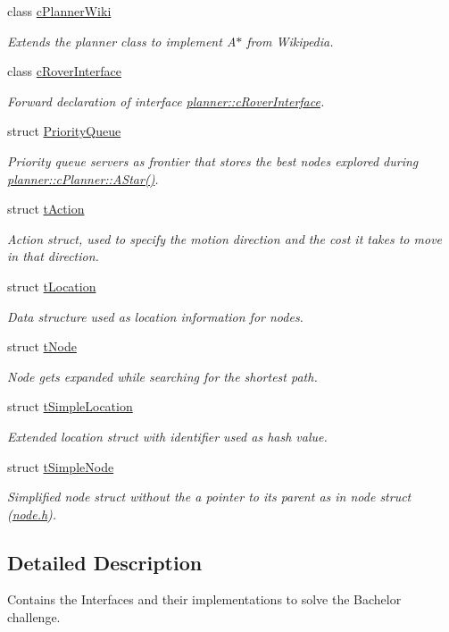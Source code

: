 \begin{DoxyCompactItemize}
class \mbox{\hyperlink{classplanner_1_1c_planner_wiki}{c\+Planner\+Wiki}}
\begin{DoxyCompactList}\small\item\em Extends the planner class to implement A$\ast$ from Wikipedia. \end{DoxyCompactList}\item 
class \mbox{\hyperlink{classplanner_1_1c_rover_interface}{c\+Rover\+Interface}}
\begin{DoxyCompactList}\small\item\em Forward declaration of interface \mbox{\hyperlink{classplanner_1_1c_rover_interface}{planner\+::c\+Rover\+Interface}}. \end{DoxyCompactList}\item 
struct \mbox{\hyperlink{structplanner_1_1_priority_queue}{Priority\+Queue}}
\begin{DoxyCompactList}\small\item\em Priority queue servers as frontier that stores the best nodes explored during \mbox{\hyperlink{classplanner_1_1c_planner_a341e70531266f023ac9461d18979d1ef}{planner\+::c\+Planner\+::\+A\+Star()}}. \end{DoxyCompactList}\item 
struct \mbox{\hyperlink{structplanner_1_1t_action}{t\+Action}}
\begin{DoxyCompactList}\small\item\em Action struct, used to specify the motion direction and the cost it takes to move in that direction. \end{DoxyCompactList}\item 
struct \mbox{\hyperlink{structplanner_1_1t_location}{t\+Location}}
\begin{DoxyCompactList}\small\item\em Data structure used as location information for nodes. \end{DoxyCompactList}\item 
struct \mbox{\hyperlink{structplanner_1_1t_node}{t\+Node}}
\begin{DoxyCompactList}\small\item\em Node gets expanded while searching for the shortest path. \end{DoxyCompactList}\item 
struct \mbox{\hyperlink{structplanner_1_1t_simple_location}{t\+Simple\+Location}}
\begin{DoxyCompactList}\small\item\em Extended location struct with identifier used as hash value. \end{DoxyCompactList}\item 
struct \mbox{\hyperlink{structplanner_1_1t_simple_node}{t\+Simple\+Node}}
\begin{DoxyCompactList}\small\item\em Simplified node struct without the a pointer to its parent as in node struct (\mbox{\hyperlink{node_8h_source}{node.\+h}}). \end{DoxyCompactList}\end{DoxyCompactItemize}


\subsection{Detailed Description}
Contains the Interfaces and their implementations to solve the Bachelor challenge. 